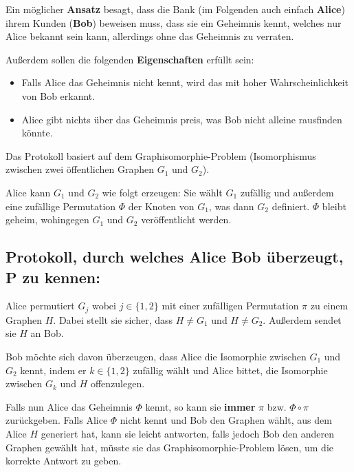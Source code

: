 \documentclass{scrartcl}%
\begin{document}
    Ein möglicher \textbf{\textsf{Ansatz}} besagt, dass die Bank (im Folgenden auch einfach \textbf{\textsf{Alice}})
    ihrem Kunden (\textbf{\textsf{Bob}}) beweisen muss, dass sie ein Geheimnis kennt, welches nur Alice bekannt sein kann,
    allerdings ohne das Geheimnis zu verraten.

    Außerdem sollen die folgenden \textbf{\textsf{Eigenschaften}} erfüllt sein:

    \begin{itemize}
        \item Falls Alice das Geheimnis nicht kennt, wird das mit hoher Wahrscheinlichkeit von Bob erkannt.
        \item Alice gibt nichts über das Geheimnis preis, was Bob nicht alleine rausfinden könnte.
    \end{itemize}

    Das Protokoll basiert auf dem Graphisomorphie-Problem (Isomorphismus zwischen zwei öffentlichen Graphen $G_1$ und $G_2$).

    Alice kann $G_1$ und $G_2$ wie folgt erzeugen: Sie wählt $G_1$ zufällig und außerdem eine zufällige Permutation $\Phi$ der Knoten von $G_1$, was dann $G_2$ definiert.
    $\Phi$ bleibt geheim, wohingegen $G_1$ und $G_2$ veröffentlicht werden.
    \newline
    \newline
    \subsection*{Protokoll, durch welches Alice Bob überzeugt, P zu kennen:}
    \newline
    \newline
    Alice permutiert $G_{j}$ wobei $j \in \{1,2\}$ mit einer zufälligen Permutation $\pi$ zu einem Graphen $H$.
    Dabei stellt sie sicher, dass $H\neq G_1$ und $H\neq G_2$.
    Außerdem sendet sie $H$ an Bob.

    Bob möchte sich davon überzeugen, dass Alice die Isomorphie zwischen $G_1$ und $G_2$ kennt,
    indem er $k \in \{1,2\}$ zufällig wählt und Alice bittet, die Isomorphie zwischen $G_k$ und $H$ offenzulegen.

    Falls nun Alice das Geheimnis $\Phi$ kennt, so kann sie \textbf{\textsf{immer}} $\pi$ bzw. $\Phi \circ \pi$ zurückgeben.
    Falls Alice $\Phi$ nicht kennt und Bob den Graphen wählt, aus dem Alice $H$ generiert hat,
    kann sie leicht antworten, falls jedoch Bob den anderen Graphen gewählt hat,
    müsste sie das Graphisomorphie-Problem lösen, um die korrekte Antwort zu geben.
\end{document}
